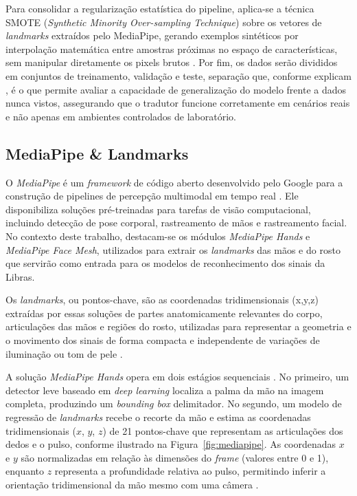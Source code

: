 \documentclass[
    12pt,                %
    openright,           %
    oneside,             %
    a4paper,             %
    english,             %
    brazil               %
]{abntex2}
\begin{document}
Para consolidar a regularização estatística do pipeline, aplica-se a técnica SMOTE (\textit{Synthetic Minority Over-sampling Technique}) sobre os vetores de \textit{landmarks} extraídos pelo MediaPipe, gerando exemplos sintéticos por interpolação matemática entre amostras próximas no espaço de características, sem manipular diretamente os pixels brutos \cite{Chawla2002}. Por fim, os dados serão divididos em conjuntos de treinamento, validação e teste, separação que, conforme explicam , é o que permite avaliar a capacidade de generalização do modelo frente a dados nunca vistos, assegurando que o tradutor funcione corretamente em cenários reais e não apenas em ambientes controlados de laboratório.

\subsection{MediaPipe \& Landmarks}

O \textit{MediaPipe} é um \textit{framework} de código aberto desenvolvido pelo Google para a construção de pipelines de percepção multimodal em tempo real \cite{Lugaresi2019}. Ele disponibiliza soluções pré-treinadas para tarefas de visão computacional, incluindo detecção de pose corporal, rastreamento de mãos e rastreamento facial. No contexto deste trabalho, destacam-se os módulos \textit{MediaPipe Hands} e \textit{MediaPipe Face Mesh}, utilizados para extrair os \textit{landmarks} das mãos e do rosto que servirão como entrada para os modelos de reconhecimento dos sinais da Libras.

Os \textit{landmarks}, ou pontos-chave, são as coordenadas tridimensionais (x,y,z) extraídas por essas soluções de partes anatomicamente relevantes do corpo, articulações das mãos e regiões do rosto, utilizadas para representar a geometria e o movimento dos sinais de forma compacta e independente de variações de iluminação ou tom de pele \cite{Zhang2020}.

A solução \textit{MediaPipe Hands} opera em dois estágios sequenciais \cite{Zhang2020}. No primeiro, um detector leve baseado em \textit{deep learning} localiza a palma da mão na imagem completa, produzindo um \textit{bounding box} delimitador. No segundo, um modelo de regressão de \textit{landmarks} recebe o recorte da mão e estima as coordenadas tridimensionais ($x$, $y$, $z$) de 21 pontos-chave que representam as articulações dos dedos e o pulso, conforme ilustrado na Figura~\ref{fig:mediapipe}. As coordenadas $x$ e $y$ são normalizadas em relação às dimensões do \textit{frame} (valores entre 0 e 1), enquanto $z$ representa a profundidade relativa ao pulso, permitindo inferir a orientação tridimensional da mão mesmo com uma câmera \cite{Zhang2020}.
\end{document}
